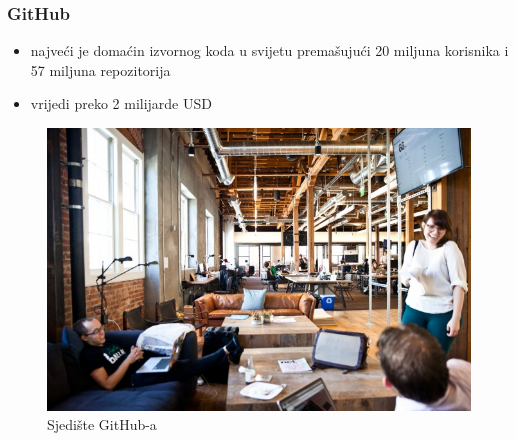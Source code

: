 \documentclass[12p, Times New Roman]{beamer}
\begin{document}
	\begin{frame}				%
		\frametitle{GitHub}
		\begin{itemize}
			\item najveći je domaćin izvornog koda u svijetu premašujući
	20 miljuna korisnika i 57 miljuna repozitorija
			\item vrijedi preko 2 milijarde USD

		\end{itemize}

		\begin{figure}[h!]
			\begin{center}
				\includegraphics[scale=0.25]{headqgit.png}
				\caption{Sjedište GitHub-a}
			\end{center}
		\end{figure}


	\end{frame}
\end{document}
